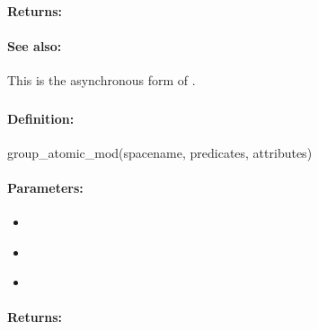 \paragraph{Returns:}


\paragraph{See also:}  This is the asynchronous form of .

\pagebreak
\subsubsection{}
\label{api:ruby:group_atomic_mod}


\paragraph{Definition:}
\begin{rubycode}
group_atomic_mod(spacename, predicates, attributes)
\end{rubycode}

\paragraph{Parameters:}
\begin{itemize}[noitemsep]
\item {}\\

\item {}\\

\item {}\\

\end{itemize}

\paragraph{Returns:}


\pagebreak
\subsubsection{}
\label{api:ruby:async_group_atomic_mod}


